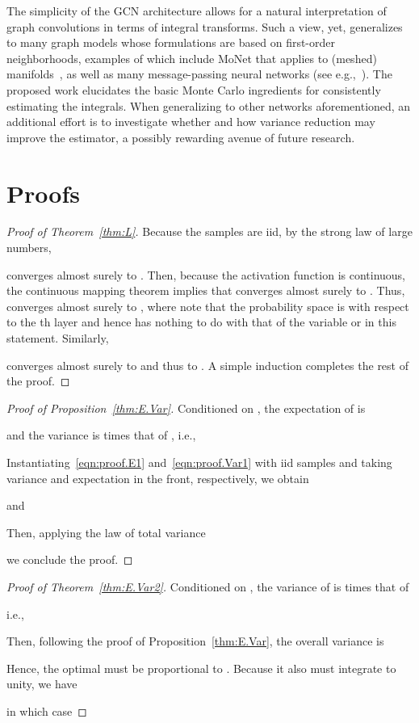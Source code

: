 \documentclass{article} \usepackage{iclr2018_conference,times}
\theoremstyle{plain}\newtheorem{theorem}{Theorem}\theoremstyle{plain}\newtheorem{proposition}[theorem]{Proposition}
\theoremstyle{plain}\newtheorem{corollary}[theorem]{Corollary}
\theoremstyle{plain}\newtheorem{lemma}[theorem]{Lemma}
\begin{document}
The simplicity of the GCN architecture allows for a natural interpretation of graph convolutions in terms of integral transforms. Such a view, yet, generalizes to many graph models whose formulations are based on first-order neighborhoods, examples of which include MoNet that applies to (meshed) manifolds~\citep{Monti2017}, as well as many message-passing neural networks (see e.g.,~\citet{Scarselli2009, Gilmer2017}). The proposed work elucidates the basic Monte Carlo ingredients for consistently estimating the integrals. When generalizing to other networks aforementioned, an additional effort is to investigate whether and how variance reduction may improve the estimator, a possibly rewarding avenue of future research.






\appendix
\section{Proofs}
\begin{proof}[Proof of Theorem~\ref{thm:L}]
Because the samples  are iid, by the strong law of large numbers,

converges almost surely to . Then, because the activation function  is continuous, the continuous mapping theorem implies that  converges almost surely to . Thus,  converges almost surely to , where note that the probability space is with respect to the th layer and hence has nothing to do with that of the variable  or  in this statement. Similarly,

converges almost surely to  and thus to . A simple induction completes the rest of the proof.
\end{proof}


\begin{proof}[Proof of Proposition~\ref{thm:E.Var}]
Conditioned on , the expectation of  is

and the variance is  times that of , i.e.,

Instantiating~\eqref{eqn:proof.E1} and~\eqref{eqn:proof.Var1} with iid samples  and taking variance and expectation in the front, respectively, we obtain

and

Then, applying the law of total variance

we conclude the proof.
\end{proof}


\begin{proof}[Proof of Theorem~\ref{thm:E.Var2}]
Conditioned on , the variance of  is  times that of

i.e.,

Then, following the proof of Proposition~\ref{thm:E.Var}, the overall variance is

Hence, the optimal  must be proportional to . Because it also must integrate to unity, we have

in which case

\end{proof}
\end{document}
